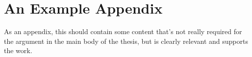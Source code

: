 
\def\chapdir{./AppendixSomething}

\chapter{An Example Appendix}\label{ap:something}

As an appendix, this should contain some content that's not really required for the argument in the main body of the thesis, but is clearly relevant and supports the work.

%
%
%

